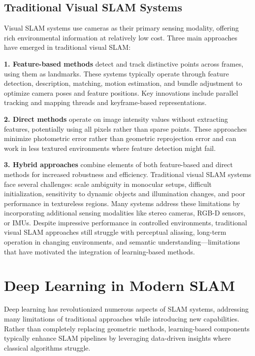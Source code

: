 \documentclass[12pt]{article}
\begin{document}
    \newpage
    \subsection{Traditional Visual SLAM Systems}
    Visual SLAM systems use cameras as their primary sensing modality, offering rich environmental information at relatively low cost. Three main approaches have emerged in traditional visual SLAM:
    
    \textbf{1. Feature-based methods} detect and track distinctive points across frames, using them as landmarks. These systems typically operate through feature detection, description, matching, 
    motion estimation, and bundle adjustment to optimize camera poses and feature positions. Key innovations include parallel tracking and mapping threads and keyframe-based representations.
    
    \textbf{2. Direct methods} operate on image intensity values without extracting features, potentially using all pixels rather than sparse points. These approaches minimize photometric error rather than 
    geometric reprojection error and can work in less textured environments where feature detection might fail.
    
    \textbf{3. Hybrid approaches} combine elements of both feature-based and direct methods for increased robustness and efficiency.
    Traditional visual SLAM systems face several challenges: scale ambiguity in monocular setups, difficult initialization, sensitivity to dynamic objects and illumination changes, and poor performance in textureless regions. 
    Many systems address these limitations by incorporating additional sensing modalities like stereo cameras, RGB-D sensors, or IMUs.
    Despite impressive performance in controlled environments, traditional visual SLAM approaches still struggle with perceptual aliasing, long-term operation in changing environments, and semantic 
    understanding—limitations that have motivated the integration of learning-based methods.

    \newpage

    \section{Deep Learning in Modern SLAM}

    Deep learning has revolutionized numerous aspects of SLAM systems, addressing many limitations of traditional approaches while introducing new capabilities. 
    Rather than completely replacing geometric methods, learning-based components typically enhance SLAM pipelines by leveraging data-driven insights where classical algorithms struggle.
    
\end{document}
